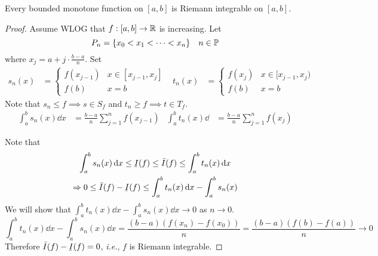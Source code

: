 
\begin{thm} \label{thm:monotone integral}
    Every bounded monotone function on $[a, b]$ is Riemann integrable on $[a, b]$.
\end{thm}
\begin{proof}
    Assume WLOG that $f : [a, b] \to \mathbb{R}$ is increasing. Let \[
        P_{n} = \set{x_{0} < x_{1} < \dots < x_{n}} \quad n \in \P
    \] where $x_{j} = a + j \cdot \frac{b - a}{n}$.
    Set
    \begin{align*}
        s_{n}(x) &=
        \begin{cases}
            f(x_{j-1}) & x \in [x_{j-1}, x_{j}] \\
            f(b) & x = b
        \end{cases}
        & t_{n}(x) &=
        \begin{cases}
            f(x_{j}) & x \in [x_{j-1}, x_{j}) \\
            f(b) & x = b
        \end{cases}
    \end{align*}
    Note that $s_{n} \leq f \implies s \in S_{f}$ and $t_{n} \geq f \implies t \in T_{f}$.
    \begin{align*}
        \int_{a}^{b} s_{n}(x) \dd x &= \frac{b-a}{n} \sum_{j=1}^{n} f(x_{j-1}) &  \int_{a}^{b} t_{n}(x) \dd &= \frac{b-a}{n} \sum_{j=1}^{n} f(x_{j})
    \end{align*}
    
    Note that \begin{multline*}
        \int_{a}^{b} s_{n}(x) \dd x \leq \ubar{I}(f) \leq \bar{I}(f) \leq \int_{a}^{b} t_{n}(x) \dd x \\
        \implies 0 \leq \bar{I}(f) - \ubar{I}(f) \leq \int_{a}^{b} t_{n}(x) \dd x - \int_{a}^{b} s_{n}(x)
    \end{multline*}
    We will show that $\int_{a}^{b} t_{n}(x) \dd x - \int_{a}^{b} s_{n}(x) \dd x \to 0$ as $n \to 0$. 
    \[
        \int_{a}^{b} t_{n}(x) \dd x - \int_{a}^{b} s_{n}(x) \dd x = \frac{(b - a)(f(x_{n}) - f(x_{0}))}{n} = \frac{(b - a)(f(b) - f(a))}{n} \to 0
    \] Therefore $\bar{I}(f) - \ubar{I}(f) = 0$, \textit{i.e.}, $f$ is Riemann integrable.
\end{proof}

